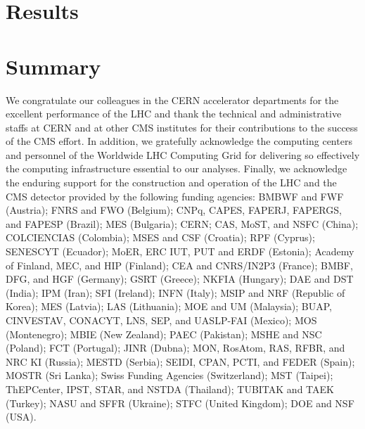 \section{Results}

\section{Summary}
\begin{acknowledgments}
\label{ack}

We congratulate our colleagues in the CERN accelerator departments for the excellent performance of the LHC and thank the technical and administrative staffs at CERN and at other CMS institutes for their contributions to the success of the CMS effort. In addition, we gratefully acknowledge the computing centers and personnel of the Worldwide LHC Computing Grid for delivering so effectively the computing infrastructure essential to our analyses. Finally, we acknowledge the enduring support for the construction and operation of the LHC and the CMS detector provided by the following funding agencies: BMBWF and FWF (Austria); FNRS and FWO (Belgium); CNPq, CAPES, FAPERJ, FAPERGS, and FAPESP (Brazil); MES (Bulgaria); CERN; CAS, MoST, and NSFC (China); COLCIENCIAS (Colombia); MSES and CSF (Croatia); RPF (Cyprus); SENESCYT (Ecuador); MoER, ERC IUT, PUT and ERDF (Estonia); Academy of Finland, MEC, and HIP (Finland); CEA and CNRS/IN2P3 (France); BMBF, DFG, and HGF (Germany); GSRT (Greece); NKFIA (Hungary); DAE and DST (India); IPM (Iran); SFI (Ireland); INFN (Italy); MSIP and NRF (Republic of Korea); MES (Latvia); LAS (Lithuania); MOE and UM (Malaysia); BUAP, CINVESTAV, CONACYT, LNS, SEP, and UASLP-FAI (Mexico); MOS (Montenegro); MBIE (New Zealand); PAEC (Pakistan); MSHE and NSC (Poland); FCT (Portugal); JINR (Dubna); MON, RosAtom, RAS, RFBR, and NRC KI (Russia); MESTD (Serbia); SEIDI, CPAN, PCTI, and FEDER (Spain); MOSTR (Sri Lanka); Swiss Funding Agencies (Switzerland); MST (Taipei); ThEPCenter, IPST, STAR, and NSTDA (Thailand); TUBITAK and TAEK (Turkey); NASU and SFFR (Ukraine); STFC (United Kingdom); DOE and NSF (USA).


\end{acknowledgments}
